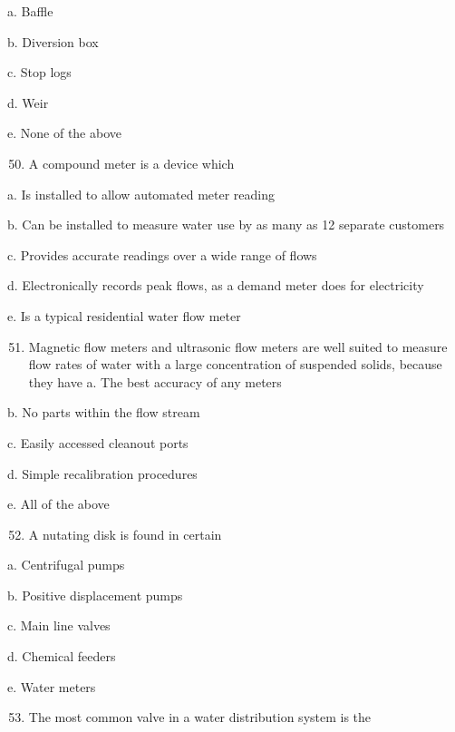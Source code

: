 \documentclass[10pt]{article}
\begin{document}
\begin{enumerate}
\begin{enumerate}
a. Baffle

b. Diversion box

c. Stop logs

d. Weir

e. None of the above

\begin{enumerate}
  \setcounter{enumi}{49}
  \item A compound meter is a device which
\end{enumerate}

a. Is installed to allow automated meter reading

b. Can be installed to measure water use by as many as 12 separate customers

c. Provides accurate readings over a wide range of flows

d. Electronically records peak flows, as a demand meter does for electricity

e. Is a typical residential water flow meter

\begin{enumerate}
  \setcounter{enumi}{50}
  \item Magnetic flow meters and ultrasonic flow meters are well suited to measure flow rates of water with a large concentration of suspended solids, because they have a. The best accuracy of any meters
\end{enumerate}

b. No parts within the flow stream

c. Easily accessed cleanout ports

d. Simple recalibration procedures

e. All of the above

\begin{enumerate}
  \setcounter{enumi}{51}
  \item A nutating disk is found in certain
\end{enumerate}

a. Centrifugal pumps

b. Positive displacement pumps

c. Main line valves

d. Chemical feeders

e. Water meters

\begin{enumerate}
  \setcounter{enumi}{52}
  \item The most common valve in a water distribution system is the
\end{enumerate}


\end{enumerate}
\end{enumerate}
\end{document}
